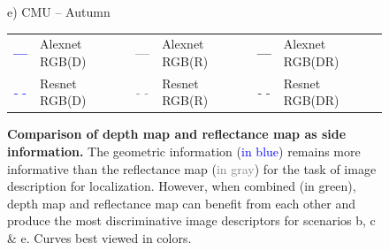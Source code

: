 \begin{figure}
\begin{minipage}{0.27\linewidth}
		e) CMU -- Autumn
	\end{minipage}
	
	\vspace{0.2cm}
	
	\begin{scriptsize}
	\begin{tabular}{c l c l c l }
		\textcolor{blue}{\textbf{\Large{---}}} & Alexnet RGB(D) & 
		\textcolor{gray}{\textbf{\Large{---}}} & Alexnet RGB(R) &
		\textcolor{lemon}{\textbf{\Large{---}}} & Alexnet RGB(DR) \\
		\textcolor{blue}{\Large{- -}} & Resnet RGB(D) & 
		\textcolor{gray}{\Large{- -}} & Resnet RGB(R) & 
		\textcolor{lemon}{\Large{- -}} & Resnet RGB(DR) \\
	\end{tabular}		
	\end{scriptsize}

	\caption[Comparison of depth map and reflectance map as side information]{\label{fig:ref_vs_depth} \textbf{Comparison of depth map and reflectance map as side information.} The geometric information (\textcolor{blue}{in blue}) remains more informative than the reflectance map (\textcolor{gray}{in gray}) for the task of image description for localization. However, when combined (in \textcolor{lemon}{green}), depth map and reflectance map can benefit from each other and produce the most discriminative image descriptors for scenarios b, c \& e. Curves best viewed in colors.}
	
\end{figure}